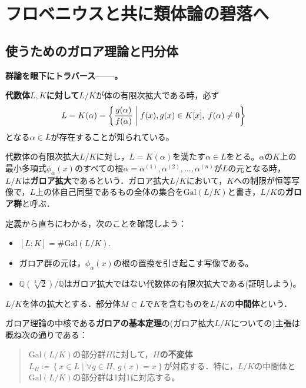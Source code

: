 \section{フロベニウスと共に類体論の碧落へ}\label{hekiraku}
\subsection{使うためのガロア理論と円分体}
\textbf{群論を眼下にトラバース------。}

\vspace{10pt}

\textbf{代数体$L,K$に対して}$L/K$が体の有限次拡大である時，必ず\[
L=K(\alpha)=\left\{\frac{g(\alpha)}{f(\alpha)}\mathrel{}\middle|\mathrel{} f(x),g(x)\in K[x],\; f(\alpha)\ne 0\right\}
\]となる$\alpha\in L$が存在することが知られている。
\begin{dfn}
    代数体の有限次拡大$L/K$に対し，$L=K(\alpha)$を満たす$\alpha\in L$をとる。$\alpha$の$K$上の最小多項式$\phi_{\alpha}(x)$のすべての根$\alpha=\alpha^{(1)},\alpha^{(2)},\ldots,\alpha^{(n)}$が$L$の元となる時，$L/K$は\textbf{ガロア拡大}であるという．ガロア拡大$L/K$において，$K$への制限が恒等写像で，$L$上の体自己同型であるもの全体の集合を$\mathrm{Gal}(L/K)$と書き，$L/K$の\textbf{ガロア群}と呼ぶ．
\end{dfn}

定義から直ちにわかる，次のことを確認しよう：
\begin{itemize}
    \item $[L:K]=\#\textrm{Gal}(L/K).$
    \item ガロア群の元は，$\phi_{\alpha}(x)$の根の置換を引き起こす写像である。
    \item $\mathds{Q}(\sqrt[3]{2})/{\mathds{Q}}$はガロア拡大ではない代数体の有限次拡大である(証明しよう)。
\end{itemize}

\begin{dfn}[中間体]
    $L/K$を体の拡大とする．部分体$M\subset L$で$K$を含むものを$L/K$の\textbf{中間体}という．
\end{dfn}

ガロア理論の中核である\textbf{ガロアの基本定理}の(ガロア拡大$L/K$についての)主張は概ね次の通りである：
\begin{quote}
    $\textrm{Gal}(L/K)$の部分群$H$に対して，\textbf{$H$の不変体}$L_H\coloneqq\left\{x\in L\mid\forall g\in H,\, g(x)=x\right\}$が対応する．特に，$L/K$の中間体と$\mathrm{Gal}(L/K)$の部分群は1対1に対応する。
\end{quote}

